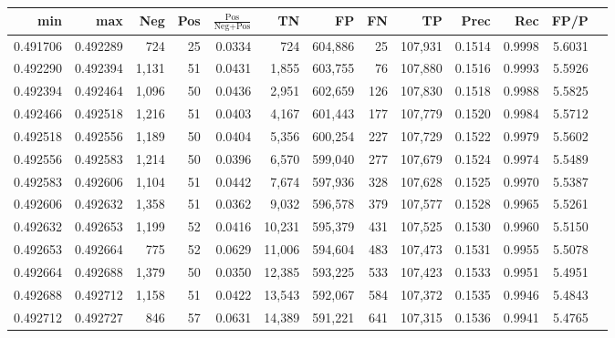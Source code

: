 \begin{tabular}{rrrrrrrrrrrrr}
\toprule
     min &      max &   Neg & Pos & $\frac{\text{Pos}}{\text{Neg}+\text{Pos}}$ &      TN &      FP &      FN &      TP &   Prec &    Rec &   FP/P \\
\midrule
0.491706 & 0.492289 &   724 &  25 &                                     0.0334 &     724 & 604,886 &      25 & 107,931 & 0.1514 & 0.9998 & 5.6031 \\
0.492290 & 0.492394 & 1,131 &  51 &                                     0.0431 &   1,855 & 603,755 &      76 & 107,880 & 0.1516 & 0.9993 & 5.5926 \\
0.492394 & 0.492464 & 1,096 &  50 &                                     0.0436 &   2,951 & 602,659 &     126 & 107,830 & 0.1518 & 0.9988 & 5.5825 \\
0.492466 & 0.492518 & 1,216 &  51 &                                     0.0403 &   4,167 & 601,443 &     177 & 107,779 & 0.1520 & 0.9984 & 5.5712 \\
0.492518 & 0.492556 & 1,189 &  50 &                                     0.0404 &   5,356 & 600,254 &     227 & 107,729 & 0.1522 & 0.9979 & 5.5602 \\
0.492556 & 0.492583 & 1,214 &  50 &                                     0.0396 &   6,570 & 599,040 &     277 & 107,679 & 0.1524 & 0.9974 & 5.5489 \\
0.492583 & 0.492606 & 1,104 &  51 &                                     0.0442 &   7,674 & 597,936 &     328 & 107,628 & 0.1525 & 0.9970 & 5.5387 \\
0.492606 & 0.492632 & 1,358 &  51 &                                     0.0362 &   9,032 & 596,578 &     379 & 107,577 & 0.1528 & 0.9965 & 5.5261 \\
0.492632 & 0.492653 & 1,199 &  52 &                                     0.0416 &  10,231 & 595,379 &     431 & 107,525 & 0.1530 & 0.9960 & 5.5150 \\
0.492653 & 0.492664 &   775 &  52 &                                     0.0629 &  11,006 & 594,604 &     483 & 107,473 & 0.1531 & 0.9955 & 5.5078 \\
0.492664 & 0.492688 & 1,379 &  50 &                                     0.0350 &  12,385 & 593,225 &     533 & 107,423 & 0.1533 & 0.9951 & 5.4951 \\
0.492688 & 0.492712 & 1,158 &  51 &                                     0.0422 &  13,543 & 592,067 &     584 & 107,372 & 0.1535 & 0.9946 & 5.4843 \\
0.492712 & 0.492727 &   846 &  57 &                                     0.0631 &  14,389 & 591,221 &     641 & 107,315 & 0.1536 & 0.9941 & 5.4765 \\

\end{tabular}
